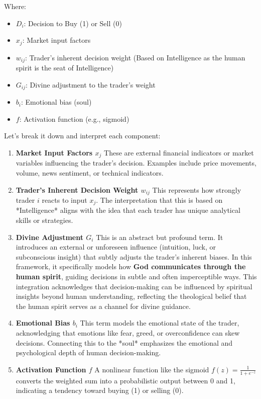 \documentclass{article}
\newcommand{\bn}{\bigskip\noindent}
\begin{document}
Where:  

\begin{itemize}
\item  $D_i$:  Decision to Buy (1) or Sell (0)  
\item $x_j$:  Market input factors  
\item $w_{ij}$:  Trader's inherent decision weight (Based on Intelligence as the human spirit is the seat of Intelligence)  
\item $G_{ij}$:  Divine adjustment to the trader's weight  
\item $b_i$:  Emotional bias (soul)  
\item $f$:  Activation function (e.g., sigmoid)
\end{itemize}

\bn
Let's break it down and interpret each component:

\begin{enumerate}
\item   {\bf Market Input Factors $x_j$}  
   These are external financial indicators or market variables influencing the trader's decision. Examples include price movements, volume, news sentiment, or technical indicators.

\item  {\bf Trader's Inherent Decision Weight $w_{ij}$}  
   This represents how strongly trader  $i$ reacts to input  $x_j$. The interpretation that this is based on *Intelligence* aligns with the idea that each trader has unique analytical skills or strategies.

\item {\bf Divine Adjustment $G_{i}$}  
This is an abstract but profound term. It introduces an external or unforeseen influence (intuition, luck, or subconscious insight) that subtly adjusts the trader's inherent biases. In this framework, it specifically models how {\bf God communicates through the human spirit}, guiding decisions in subtle and often imperceptible ways. This integration acknowledges that decision-making can be influenced by spiritual insights beyond human understanding, reflecting the theological belief that the human spirit serves as a channel for divine guidance.

\item  {\bf Emotional Bias $b_{i}$}
   This term models the emotional state of the trader, acknowledging that emotions like fear, greed, or overconfidence can skew decisions. Connecting this to the *soul* emphasizes the emotional and psychological depth of human decision-making.

\item  {\bf Activation Function $f$}  
   A nonlinear function like the sigmoid $ f(z) = \displaystyle \frac{1}{1 + e^{-z}} $ converts the weighted sum into a probabilistic output between 0 and 1, indicating a tendency toward buying (1) or selling (0).  
\end{enumerate}
\end{document}
